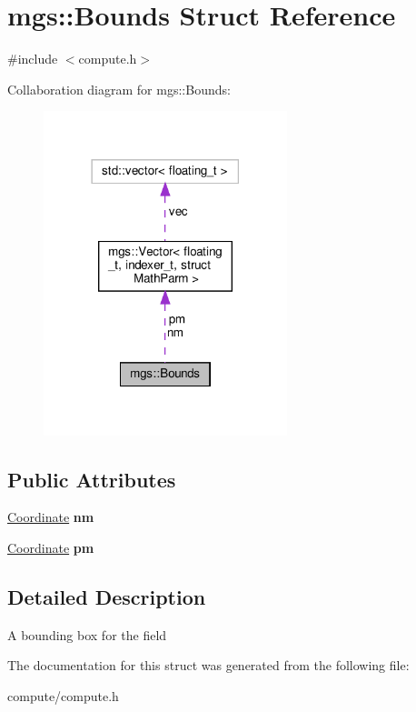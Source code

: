 \hypertarget{structmgs_1_1Bounds}{}\section{mgs\+:\+:Bounds Struct Reference}
\label{structmgs_1_1Bounds}


{\ttfamily \#include $<$compute.\+h$>$}



Collaboration diagram for mgs\+:\+:Bounds\+:
\nopagebreak
\begin{figure}[H]
\begin{center}
\leavevmode
\includegraphics[width=201pt]{structmgs_1_1Bounds__coll__graph}
\end{center}
\end{figure}
\subsection*{Public Attributes}
\begin{DoxyCompactItemize}
\item 
\mbox{\label{structmgs_1_1Bounds_a8bfd61fc90b20728aeffdb34c319efa8}} 
\hyperlink{structmgs_1_1Vector}{Coordinate} {\bfseries nm}
\item 
\mbox{\label{structmgs_1_1Bounds_a1c376b96ff5b0193d00e809ee564bcba}} 
\hyperlink{structmgs_1_1Vector}{Coordinate} {\bfseries pm}
\end{DoxyCompactItemize}


\subsection{Detailed Description}
A bounding box for the field 

The documentation for this struct was generated from the following file\+:\begin{DoxyCompactItemize}
\item 
compute/compute.\+h\end{DoxyCompactItemize}

